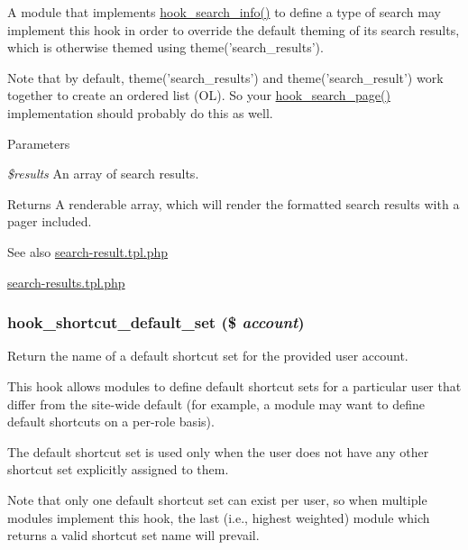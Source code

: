 A module that implements \hyperlink{group__search_ga37b761616f2cad4796891008f2b374f3}{hook\_\-search\_\-info()} to define a type of search may implement this hook in order to override the default theming of its search results, which is otherwise themed using theme('search\_\-results').

Note that by default, theme('search\_\-results') and theme('search\_\-result') work together to create an ordered list (OL). So your \hyperlink{group__hooks_ga422b9506b3dfd8ed5aa8bfaea98844b9}{hook\_\-search\_\-page()} implementation should probably do this as well.


\begin{DoxyParams}{Parameters}
\item[{\em \$results}]An array of search results.\end{DoxyParams}
\begin{DoxyReturn}{Returns}
A renderable array, which will render the formatted search results with a pager included.
\end{DoxyReturn}
\begin{DoxySeeAlso}{See also}
\hyperlink{search-result_8tpl_8php}{search-\/result.tpl.php} 

\hyperlink{search-results_8tpl_8php}{search-\/results.tpl.php} 
\end{DoxySeeAlso}
\hypertarget{group__hooks_ga5fe90af5e2617387b8b14dc51fc356ab}{
\subsubsection[{hook\_\-shortcut\_\-default\_\-set}]{\setlength{\rightskip}{0pt plus 5cm}hook\_\-shortcut\_\-default\_\-set (\$ {\em account})}}
\label{group__hooks_ga5fe90af5e2617387b8b14dc51fc356ab}
Return the name of a default shortcut set for the provided user account.

This hook allows modules to define default shortcut sets for a particular user that differ from the site-\/wide default (for example, a module may want to define default shortcuts on a per-\/role basis).

The default shortcut set is used only when the user does not have any other shortcut set explicitly assigned to them.

Note that only one default shortcut set can exist per user, so when multiple modules implement this hook, the last (i.e., highest weighted) module which returns a valid shortcut set name will prevail.


